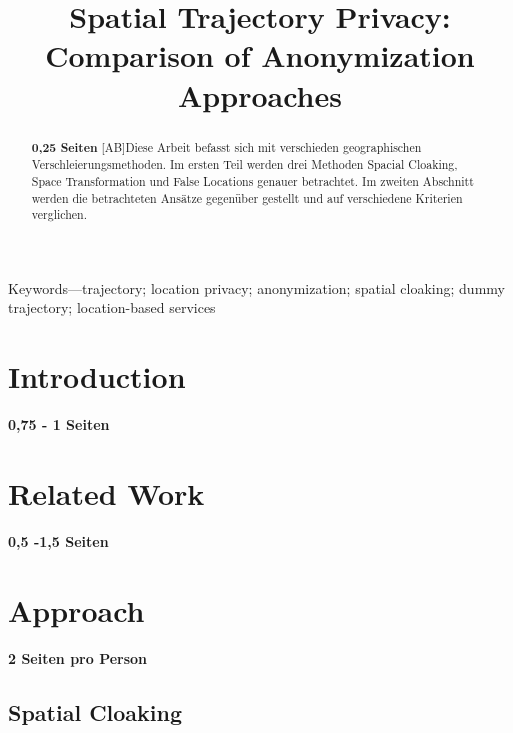 \documentclass[conference]{IEEEtran}
\begin{document}
\title{Spatial Trajectory Privacy: Comparison of Anonymization Approaches}

\author{
}

\maketitle


\begin{abstract}
\textbf{0,25 Seiten}
[AB]Diese Arbeit befasst sich mit verschieden geographischen Verschleierungsmethoden. Im ersten Teil werden drei Methoden Spacial Cloaking, Space Transformation und False Locations genauer betrachtet. Im zweiten Abschnitt werden die betrachteten Ansätze gegenüber gestellt und auf verschiedene Kriterien verglichen. 
\end{abstract}

Keywords—trajectory; location privacy; anonymization; spatial cloaking; dummy trajectory; location-based services

\IEEEpeerreviewmaketitle


\section{Introduction}
\textbf{0,75 - 1 Seiten}



\section{Related Work}
\textbf{0,5 -1,5 Seiten}

 

\section{Approach}
\textbf{2 Seiten pro Person}



\subsection{Spatial Cloaking}

\end{document}
